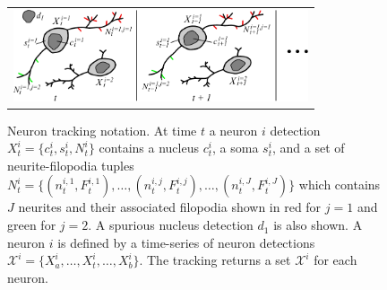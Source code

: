 \begin{figure}[t]
  \begin{center}
       \begin{tabular}{@{\hspace{-1mm}}c}
        \includegraphics[width = 87mm] {images/neurondrawing.pdf}\\ [-2.4ex]
       \end{tabular} 
    \caption{ \footnotesize   Neuron  tracking  notation.  At time $t$ a neuron $i$ detection $X_t^i = \{ c_t^i,
        s_t^i, N_t^i  \}$ contains a nucleus $c_t^i$,  a soma $s_t^i$,
        and    a  set of   neurite-filopodia    tuples    $N_t^i     =    \{(
        n_t^{i,1},F_t^{i,1}),   \ldots,(n_t^{i,j},F_t^{i,j}),  \ldots,
        (n_t^{i,J},F_t^{i,J})  \}$  which  contains $J$  neurites  and
        their associated  filopodia shown in  red for $j=1$  and green
        for  $j=2$. A spurious nucleus  detection  $d_1$ is also shown.
        A neuron $i$  is defined by  a time-series of  neuron detections
        $\mathcal{X}^i     =     \{X_{a}^i,\ldots,X_t^i,\ldots,X_{b}^i
        \}$.  The  tracking returns  a  set  $\mathcal{X}^i$ for  each
        neuron. }
    \label{fig:notation}
  \end{center}
\vspace{-8mm}
\end{figure}







\vspace{-3mm}
